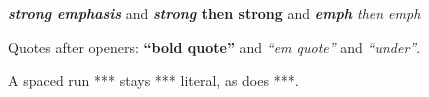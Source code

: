 \textbf{\emph{strong emphasis}} and \textbf{\emph{strong} then strong}
and \emph{\textbf{emph} then emph}

Quotes after openers: \textbf{``bold quote''} and \emph{``em quote''}
and \emph{``under''}.

A spaced run *** stays *** literal, as does ***.
